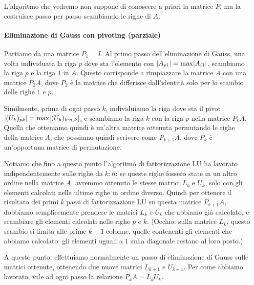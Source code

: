 \documentclass[a4paper]{report}
\DeclarePairedDelimiter{\abs}{\lvert}{\rvert}
\theoremstyle{definiton}
\theoremstyle{remark}
\begin{document}
L'algoritmo che vedremo non suppone di conoscere a priori la matrice $P$, ma la costruisce passo per passo scambiando le righe di $A$.

\paragraph{Eliminazione di Gauss con pivoting (parziale)}

Partiamo da una matrice $P_1 = I$. Al primo passo dell'eliminazione di Gauss, una volta individuata la riga $p$ dove sta l'elemento con $\abs{A_{p1}} = \max \abs{A_{i1}}$, scambiamo la riga $p$ e la riga $1$ in $A$. Questo corrisponde a rimpiazzare la matrice $A$ con una matrice $P_2A$, dove $P_2$ è la matrice che differisce dall'identità solo per lo scambio delle righe $1$ e $p$.

Similmente, prima di ogni passo $k$, individuiamo la riga dove sta il pivot $\abs{(U_k)_{pk}} = \max \abs{(U_k)_{k:n,k}}$, e scambiamo la riga $k$ con la riga $p$ nella matrice $P_k A$. Quella che otteniamo quindi è un'altra matrice ottenuta permutando le righe della matrice $A$, che possiamo quindi scrivere come $P_{k+1} A$, dove $P_k$ è un'opportuna matrice di permutazione.

Notiamo che fino a questo punto l'algoritmo di fattorizzazione LU ha lavorato indipendentemente sulle righe da $k:n$: se queste righe fossero state in un altro ordine nella matrice $A$, avremmo ottenuto le stesse matrici $L_k$ e $U_k$, solo con gli elementi calcolati nelle ultime righe in ordine diverso. Quindi per ottenere il risultato dei primi $k$ passi di fattorizzazione LU su questa matrice $P_{k+1} A$, dobbiamo semplicemente prendere le matrici $L_k$ e $U_k$ che abbiamo già calcolato, e scambiare gli elementi calcolati nelle righe $p$ e $k$. (Occhio: sulla matrice $L_k$, questo scambio si limita alle prime $k-1$ colonne, quelle contenenti gli elementi che abbiamo calcolato: gli elementi uguali a $1$ sulla diagonale restano al loro posto.)

A questo punto, effettuiamo normalmente un passo di eliminazione di Gauss sulle matrici ottenute, ottenendo due nuove matrici $L_{k+1}$ e $U_{k+1}$. Per come abbiamo lavorato, vale ad ogni passo la relazione $P_k A = L_k U_k$.
\end{document}

